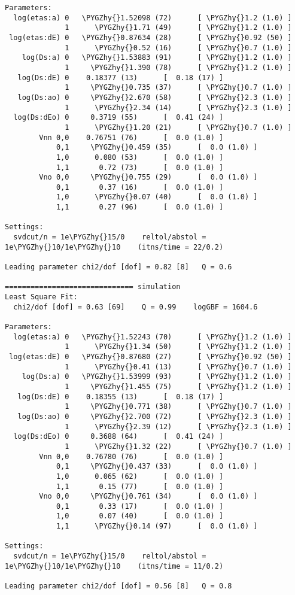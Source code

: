 \documentclass[letterpaper,10pt,english]{sphinxmanual}
\def\PYGZhy{\char`\-}
\begin{document}
\begin{Verbatim}[commandchars=\\\{\}]
Parameters:
  log(etas:a) 0   \PYGZhy{}1.52098 (72)      [ \PYGZhy{}1.2 (1.0) ]  
              1      \PYGZhy{}1.71 (49)      [ \PYGZhy{}1.2 (1.0) ]  
 log(etas:dE) 0   \PYGZhy{}0.87634 (28)      [ \PYGZhy{}0.92 (50) ]  
              1      \PYGZhy{}0.52 (16)      [ \PYGZhy{}0.7 (1.0) ]  
    log(Ds:a) 0   \PYGZhy{}1.53883 (91)      [ \PYGZhy{}1.2 (1.0) ]  
              1     \PYGZhy{}1.390 (78)      [ \PYGZhy{}1.2 (1.0) ]  
   log(Ds:dE) 0    0.18377 (13)      [  0.18 (17) ]  
              1     \PYGZhy{}0.735 (37)      [ \PYGZhy{}0.7 (1.0) ]  
   log(Ds:ao) 0     \PYGZhy{}2.670 (58)      [ \PYGZhy{}2.3 (1.0) ]  
              1      \PYGZhy{}2.34 (14)      [ \PYGZhy{}2.3 (1.0) ]  
  log(Ds:dEo) 0     0.3719 (55)      [  0.41 (24) ]  
              1      \PYGZhy{}1.20 (21)      [ \PYGZhy{}0.7 (1.0) ]  
        Vnn 0,0    0.76751 (76)      [  0.0 (1.0) ]  
            0,1     \PYGZhy{}0.459 (35)      [  0.0 (1.0) ]  
            1,0      0.080 (53)      [  0.0 (1.0) ]  
            1,1       0.72 (73)      [  0.0 (1.0) ]  
        Vno 0,0     \PYGZhy{}0.755 (29)      [  0.0 (1.0) ]  
            0,1       0.37 (16)      [  0.0 (1.0) ]  
            1,0      \PYGZhy{}0.07 (40)      [  0.0 (1.0) ]  
            1,1       0.27 (96)      [  0.0 (1.0) ]  

Settings:
  svdcut/n = 1e\PYGZhy{}15/0    reltol/abstol = 1e\PYGZhy{}10/1e\PYGZhy{}10    (itns/time = 22/0.2)

Leading parameter chi2/dof [dof] = 0.82 [8]   Q = 0.6

============================== simulation
Least Square Fit:
  chi2/dof [dof] = 0.63 [69]    Q = 0.99    logGBF = 1604.6

Parameters:
  log(etas:a) 0   \PYGZhy{}1.52243 (70)      [ \PYGZhy{}1.2 (1.0) ]  
              1      \PYGZhy{}1.34 (50)      [ \PYGZhy{}1.2 (1.0) ]  
 log(etas:dE) 0   \PYGZhy{}0.87680 (27)      [ \PYGZhy{}0.92 (50) ]  
              1      \PYGZhy{}0.41 (13)      [ \PYGZhy{}0.7 (1.0) ]  
    log(Ds:a) 0   \PYGZhy{}1.53999 (93)      [ \PYGZhy{}1.2 (1.0) ]  
              1     \PYGZhy{}1.455 (75)      [ \PYGZhy{}1.2 (1.0) ]  
   log(Ds:dE) 0    0.18355 (13)      [  0.18 (17) ]  
              1     \PYGZhy{}0.771 (38)      [ \PYGZhy{}0.7 (1.0) ]  
   log(Ds:ao) 0     \PYGZhy{}2.700 (72)      [ \PYGZhy{}2.3 (1.0) ]  
              1      \PYGZhy{}2.39 (12)      [ \PYGZhy{}2.3 (1.0) ]  
  log(Ds:dEo) 0     0.3688 (64)      [  0.41 (24) ]  
              1      \PYGZhy{}1.32 (22)      [ \PYGZhy{}0.7 (1.0) ]  
        Vnn 0,0    0.76780 (76)      [  0.0 (1.0) ]  
            0,1     \PYGZhy{}0.437 (33)      [  0.0 (1.0) ]  
            1,0      0.065 (62)      [  0.0 (1.0) ]  
            1,1       0.15 (77)      [  0.0 (1.0) ]  
        Vno 0,0     \PYGZhy{}0.761 (34)      [  0.0 (1.0) ]  
            0,1       0.33 (17)      [  0.0 (1.0) ]  
            1,0       0.07 (40)      [  0.0 (1.0) ]  
            1,1      \PYGZhy{}0.14 (97)      [  0.0 (1.0) ]  

Settings:
  svdcut/n = 1e\PYGZhy{}15/0    reltol/abstol = 1e\PYGZhy{}10/1e\PYGZhy{}10    (itns/time = 11/0.2)

Leading parameter chi2/dof [dof] = 0.56 [8]   Q = 0.8
\end{Verbatim}
\end{document}
